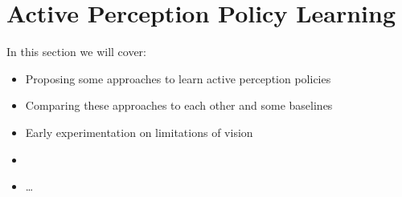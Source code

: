 \chapter{Active Perception Policy Learning}
In this section we will cover:
  \begin{itemize}
    \item Proposing some approaches to learn active perception policies
    \item Comparing these approaches to each other and some baselines 
    \item Early experimentation on limitations of vision
    \item 
    \item \ldots
  \end{itemize}
